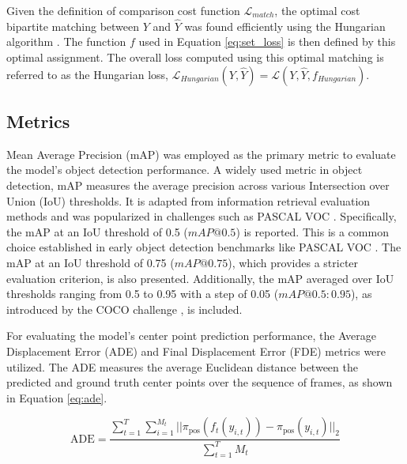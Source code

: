 Given the definition of comparison cost function $\mathcal{L}_{match}$, the optimal cost bipartite matching between $ Y $ and $ \hat{Y} $ was found efficiently using the Hungarian algorithm \cite{kuhnHungarianMethodAssignment1955}. The function $f$ used in Equation \ref{eq:set_loss} is then defined by this optimal assignment. The overall loss computed using this optimal matching is referred to as the Hungarian loss, $\mathcal{L}_{Hungarian}(Y, \hat{Y}) = \mathcal{L}(Y, \hat{Y}, f_{Hungarian})$.

\subsection{Metrics} \label{Methods:Metrics}

Mean Average Precision (mAP) was employed as the primary metric to evaluate the model's object detection performance. A widely used metric in object detection, mAP measures the average precision across various Intersection over Union (IoU) thresholds. It is adapted from information retrieval evaluation methods and was popularized in challenges such as PASCAL VOC \cite{everinghamPascalVisualObject2010}. Specifically, the mAP at an IoU threshold of 0.5 ($mAP@0.5$) is reported. This is a common choice established in early object detection benchmarks like PASCAL VOC \cite{everinghamPascalVisualObject2010}. The mAP at an IoU threshold of 0.75 ($mAP@0.75$), which provides a stricter evaluation criterion, is also presented. Additionally, the mAP averaged over IoU thresholds ranging from 0.5 to 0.95 with a step of 0.05 ($mAP@0.5:0.95$), as introduced by the COCO challenge \cite{linMicrosoftCOCOCommon2015a}, is included.

For evaluating the model's center point prediction performance, the Average Displacement Error (ADE) and Final Displacement Error (FDE) metrics were utilized. The ADE measures the average Euclidean distance between the predicted and ground truth center points over the sequence of frames, as shown in Equation \ref{eq:ade}.

\begin{equation}
    \text{ADE} = \frac{\sum_{t=1}^{T} \sum_{i=1}^{M_t} || \pi_{\text{pos}}(f_t(y_{i,t})) - \pi_{\text{pos}}(y_{i,t}) ||_2}{\sum_{t=1}^{T} M_t}
    \label{eq:ade}
\end{equation}


